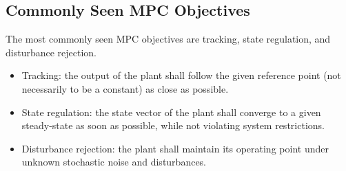 \subsection{Commonly Seen MPC Objectives}

The most commonly seen MPC objectives are tracking, state regulation, and disturbance rejection. 
\begin{itemize}
  \item Tracking: the output of the plant shall follow the given reference point (not necessarily to be a constant) as close as possible.
  \item State regulation: the state vector of the plant shall converge to a given steady-state as soon as possible, while not violating system restrictions.
  \item Disturbance rejection: the plant shall maintain its operating point under unknown stochastic noise and disturbances.
\end{itemize}








